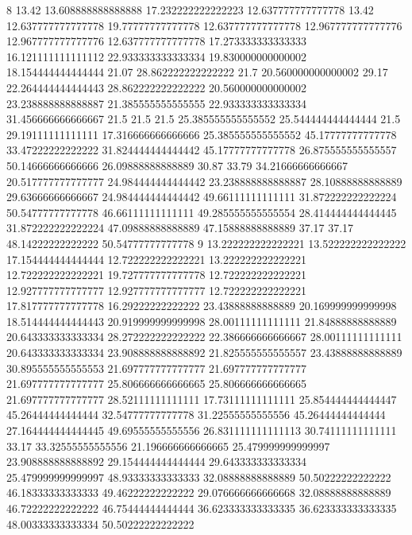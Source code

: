 8 13.42 13.608888888888888 17.232222222222223 12.637777777777778 13.42 12.637777777777778 19.77777777777778 12.637777777777778 12.967777777777776 12.967777777777776 12.637777777777778 17.273333333333333 16.121111111111112 22.933333333333334 19.830000000000002 18.154444444444444 21.07 28.862222222222222 21.7 20.560000000000002 29.17 22.264444444444443 28.862222222222222 20.560000000000002 23.238888888888887 21.385555555555555 22.933333333333334 31.456666666666667 21.5 21.5 21.5 25.385555555555552 25.544444444444444 21.5 29.19111111111111 17.316666666666666 25.385555555555552 45.17777777777778 33.47222222222222 31.824444444444442 45.17777777777778 26.875555555555557 50.14666666666666 26.09888888888889 30.87 33.79 34.21666666666667 20.517777777777777 24.984444444444442 23.238888888888887 28.10888888888889 29.63666666666667 24.984444444444442 49.66111111111111 31.872222222222224 50.54777777777778 46.66111111111111 49.285555555555554 28.414444444444445 31.872222222222224 47.09888888888889 47.15888888888889 37.17 37.17 48.14222222222222 50.54777777777778
9 13.222222222222221 13.522222222222222 17.154444444444444 12.722222222222221 13.222222222222221 12.722222222222221 19.727777777777778 12.722222222222221 12.927777777777777 12.927777777777777 12.722222222222221 17.817777777777778 16.29222222222222 23.43888888888889 20.169999999999998 18.514444444444443 20.919999999999998 28.00111111111111 21.84888888888889 20.643333333333334 28.272222222222222 22.386666666666667 28.00111111111111 20.643333333333334 23.908888888888892 21.825555555555557 23.43888888888889 30.895555555555553 21.697777777777777 21.697777777777777 21.697777777777777 25.806666666666665 25.806666666666665 21.697777777777777 28.52111111111111 17.73111111111111 25.854444444444447 45.26444444444444 32.54777777777778 31.22555555555556 45.26444444444444 27.164444444444445 49.69555555555556 26.831111111111113 30.74111111111111 33.17 33.32555555555556 21.196666666666665 25.479999999999997 23.908888888888892 29.154444444444444 29.643333333333334 25.479999999999997 48.93333333333333 32.08888888888889 50.50222222222222 46.18333333333333 49.46222222222222 29.076666666666668 32.08888888888889 46.72222222222222 46.75444444444444 36.623333333333335 36.623333333333335 48.00333333333334 50.50222222222222
